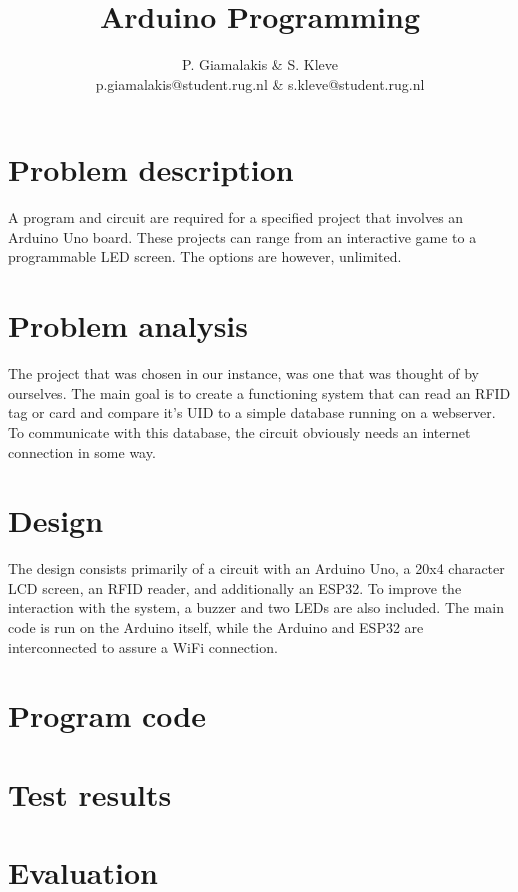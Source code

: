 \documentclass[a4paper,10pt]{article}
\title{Arduino Programming}
\author{P. Giamalakis \& S. Kleve\\
        p.giamalakis@student.rug.nl \& s.kleve@student.rug.nl}
\begin{document}
\maketitle

\section{Problem description}
 A program and circuit are required for a specified project that involves an Arduino Uno board.  These projects can range from an interactive game to a programmable LED screen. The options are however, unlimited.

\section{Problem analysis}
The project that was chosen in our instance, was one that was thought of by ourselves. The main goal is to create a functioning system that can read an RFID tag or card and compare it's UID to a simple database running on a webserver. To communicate with this database, the circuit obviously needs an internet connection in some way.

\section{Design}
The design consists primarily of a circuit with an Arduino Uno, a 20x4 character LCD screen, an RFID reader, and additionally an ESP32. To improve the interaction with the system, a buzzer and two LEDs are also included. The main code is run on the Arduino itself, while the Arduino and ESP32 are interconnected to assure a WiFi connection.

\newpage
\section{Program code}
\lstset{style=code}


\newpage


\section{Test results}


\section{Evaluation}
\end{document}
